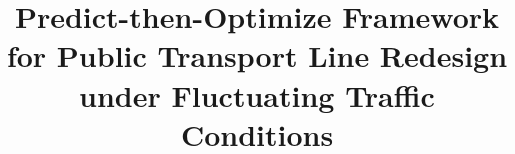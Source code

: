 \documentclass[a4paper,fleqn]{cas-sc}
\begin{document}
\let\WriteBookmarks\relax
\renewcommand{\topfraction}{0.9}
\renewcommand{\bottomfraction}{0.8}
\renewcommand{\textfraction}{0.07}
\renewcommand{\floatpagefraction}{0.75}
\setcounter{topnumber}{3}
\setcounter{bottomnumber}{2}
\setcounter{totalnumber}{5}


\shortauthors{}  

\title [mode = title]{
Predict-then-Optimize Framework for Public Transport Line Redesign under Fluctuating Traffic Conditions
}



\tnotetext[1]{} 

%

%
%
%
%
%
%
\end{document}
